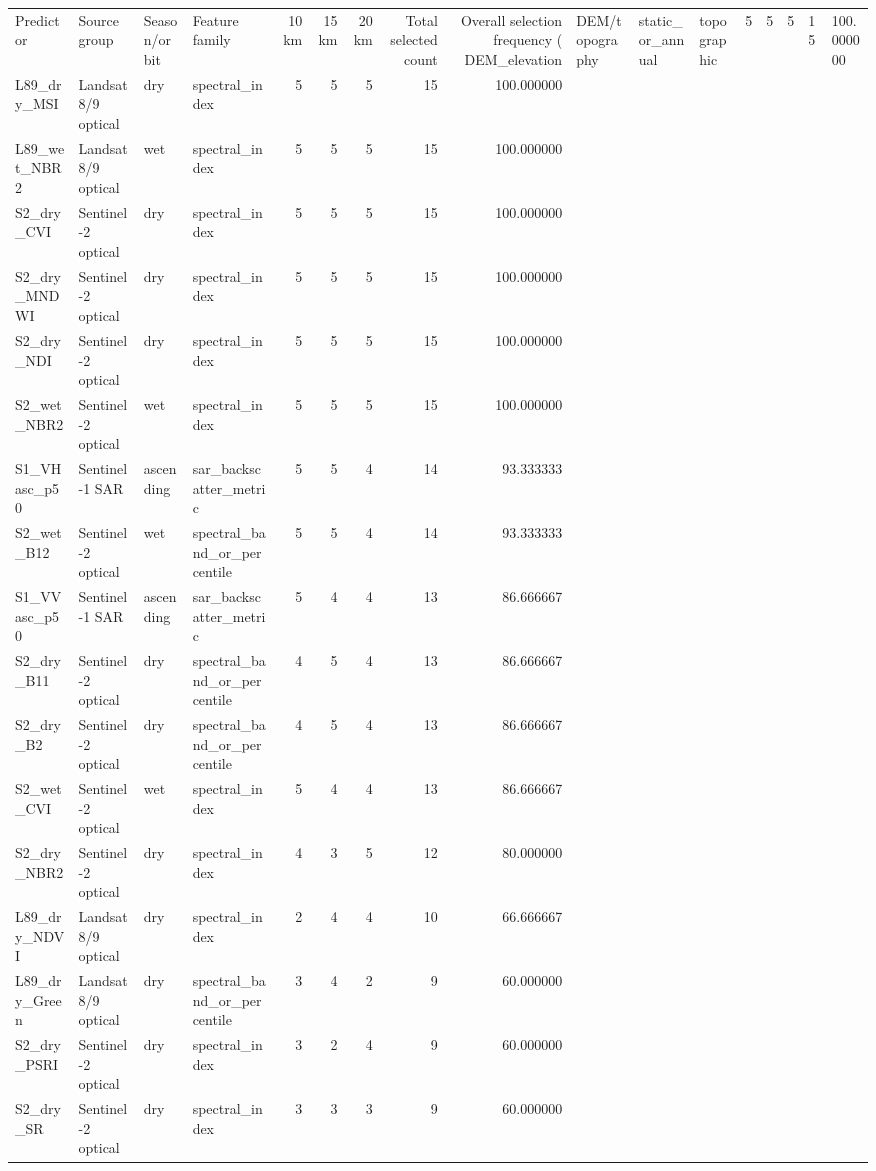 \begin{tabular}{llllrrrrr}
\toprule
Predictor & Source group & Season/orbit & Feature family & 10 km & 15 km & 20 km & Total selected count & Overall selection frequency (%
\midrule
DEM_elevation & DEM/topography & static_or_annual & topographic & 5 & 5 & 5 & 15 & 100.000000 \\
L89_dry_MSI & Landsat 8/9 optical & dry & spectral_index & 5 & 5 & 5 & 15 & 100.000000 \\
L89_wet_NBR2 & Landsat 8/9 optical & wet & spectral_index & 5 & 5 & 5 & 15 & 100.000000 \\
S2_dry_CVI & Sentinel-2 optical & dry & spectral_index & 5 & 5 & 5 & 15 & 100.000000 \\
S2_dry_MNDWI & Sentinel-2 optical & dry & spectral_index & 5 & 5 & 5 & 15 & 100.000000 \\
S2_dry_NDI & Sentinel-2 optical & dry & spectral_index & 5 & 5 & 5 & 15 & 100.000000 \\
S2_wet_NBR2 & Sentinel-2 optical & wet & spectral_index & 5 & 5 & 5 & 15 & 100.000000 \\
S1_VHasc_p50 & Sentinel-1 SAR & ascending & sar_backscatter_metric & 5 & 5 & 4 & 14 & 93.333333 \\
S2_wet_B12 & Sentinel-2 optical & wet & spectral_band_or_percentile & 5 & 5 & 4 & 14 & 93.333333 \\
S1_VVasc_p50 & Sentinel-1 SAR & ascending & sar_backscatter_metric & 5 & 4 & 4 & 13 & 86.666667 \\
S2_dry_B11 & Sentinel-2 optical & dry & spectral_band_or_percentile & 4 & 5 & 4 & 13 & 86.666667 \\
S2_dry_B2 & Sentinel-2 optical & dry & spectral_band_or_percentile & 4 & 5 & 4 & 13 & 86.666667 \\
S2_wet_CVI & Sentinel-2 optical & wet & spectral_index & 5 & 4 & 4 & 13 & 86.666667 \\
S2_dry_NBR2 & Sentinel-2 optical & dry & spectral_index & 4 & 3 & 5 & 12 & 80.000000 \\
L89_dry_NDVI & Landsat 8/9 optical & dry & spectral_index & 2 & 4 & 4 & 10 & 66.666667 \\
L89_dry_Green & Landsat 8/9 optical & dry & spectral_band_or_percentile & 3 & 4 & 2 & 9 & 60.000000 \\
S2_dry_PSRI & Sentinel-2 optical & dry & spectral_index & 3 & 2 & 4 & 9 & 60.000000 \\
S2_dry_SR & Sentinel-2 optical & dry & spectral_index & 3 & 3 & 3 & 9 & 60.000000 \\

\end{tabular}
